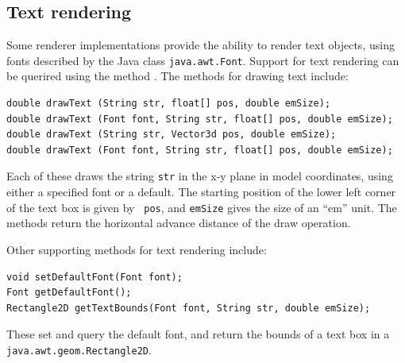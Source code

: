 \subsection{Text rendering}

Some renderer implementations provide the ability to render text
objects, using fonts described by the Java class {\tt java.awt.Font}. 
Support for text rendering can be querired using the
method .
The methods for drawing text include:
%
\begin{lstlisting}[]
double drawText (String str, float[] pos, double emSize);
double drawText (Font font, String str, float[] pos, double emSize);
double drawText (String str, Vector3d pos, double emSize);
double drawText (Font font, String str, float[] pos, double emSize);
\end{lstlisting}
%
Each of these draws the string {\tt str} in the x-y plane in model
coordinates, using either a specified font or a default. The starting
position of the lower left corner of the text box is given by {\tt
pos}, and {\tt emSize} gives the size of an ``em'' unit. The methods
return the horizontal advance distance of the draw operation.

Other supporting methods for text rendering include:
%
\begin{lstlisting}[]
void setDefaultFont(Font font);
Font getDefaultFont();
Rectangle2D getTextBounds(Font font, String str, double emSize);
\end{lstlisting}
%
These set and query the default font, and return the bounds of a text
box in a {\tt java.awt.geom.Rectangle2D}.


